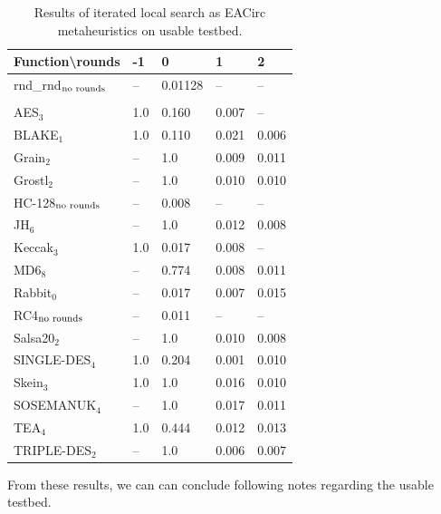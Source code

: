\documentclass[
  print, %
  Table,   %
  nolof,     %
  nolot,     %
  11pt, %
  oneside  %
]{fithesis3}
\newcommand{\fd}{\cellcolor{red!13}}
\newcommand{\fn}{\cellcolor{green!13}}
\begin{document}
\begin{table}[H]
\centering
\begin{tabular}{l|l l l l}
Function\textbackslash{}rounds & -1 & 0 & 1 & 2\\ \hline
rnd\_rnd$_{\textnormal{no rounds}}$ & --  & \fn{}0.01128& --   & -- \\\\
AES$_{3}$        & \fd{}1.0   & \fd{}0.160 & \fn{}0.007 & \fn{}--   \\
BLAKE$_{1}$      & \fd{}1.0   & \fd{}0.110 & \fn{}0.021 & \fn{}0.006\\
Grain$_{2}$      & \fd{}--    & \fd{}1.0   & \fn{}0.009 & \fn{}0.011\\
Grostl$_{2}$     & \fd{}--    & \fd{}1.0   & \fn{}0.010 & \fn{}0.010\\
HC-128$_{\textnormal{no rounds}}$& -- & \fn{}0.008 & -- & --        \\
JH$_{6}$         & \fd{}--    & \fd{}1.0   & \fn{}0.012 & \fn{}0.008\\
Keccak$_{3}$     & \fd{}1.0   & \fn{}0.017 & \fn{}0.008 & \fn{}--   \\
MD6$_{8}$        & \fd{}--    & \fd{}0.774 & \fn{}0.008 & \fn{}0.011\\
Rabbit$_{0}$     &      --    & \fn{}0.017 & \fn{}0.007 & \fn{}0.015\\
RC4$_{\textnormal{no rounds}}$& -- & \fn{}0.011 & --    & --        \\
Salsa20$_{2}$    & \fd{}--    & \fd{}1.0   & \fn{}0.010 & \fn{}0.008\\
SINGLE-DES$_{4}$ & \fd{}1.0   & \fd{}0.204 & \fn{}0.001 & \fn{}0.010\\
Skein$_{3}$      & \fd{}1.0   & \fd{}1.0   & \fn{}0.016 & \fn{}0.010\\
SOSEMANUK$_{4}$  & \fd{}--    & \fd{}1.0   & \fn{}0.017 & \fn{}0.011\\
TEA$_{4}$        & \fd{}1.0   & \fd{}0.444 & \fn{}0.012 & \fn{}0.013\\
TRIPLE-DES$_{2}$ & \fd{}--    & \fd{}1.0   & \fn{}0.006 & \fn{}0.007
\end{tabular}
\caption{Results of iterated local search as EACirc metaheuristics on usable testbed.}
\label{table:res-usable-ils}
\end{table}

From these results, we can can conclude following notes regarding the usable testbed.
\end{document}
